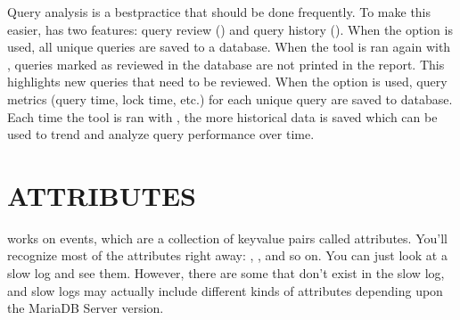\documentclass[letterpaper,10pt,english]{sphinxmanual}
\begin{document}
\sphinxAtStartPar
Query analysis is a best\sphinxhyphen{}practice that should be done frequently.  To
make this easier,  has two features: query review
({\hyperref[\detokenize{mariadb-query-digest:cmdoption-mariadb-query-digest-review}]{}}) and query history ({\hyperref[\detokenize{mariadb-query-digest:cmdoption-mariadb-query-digest-history}]{}}).  When the {\hyperref[\detokenize{mariadb-query-digest:cmdoption-mariadb-query-digest-review}]{}}
option is used, all unique queries are saved to a database.  When the
tool is ran again with {\hyperref[\detokenize{mariadb-query-digest:cmdoption-mariadb-query-digest-review}]{}}, queries marked as reviewed in
the database are not printed in the report.  This highlights new queries
that need to be reviewed.  When the {\hyperref[\detokenize{mariadb-query-digest:cmdoption-mariadb-query-digest-history}]{}} option is used,
query metrics (query time, lock time, etc.) for each unique query are
saved to database.  Each time the tool is ran with {\hyperref[\detokenize{mariadb-query-digest:cmdoption-mariadb-query-digest-history}]{}}, the
more historical data is saved which can be used to trend and analyze
query performance over time.


\section{ATTRIBUTES}
\label{\detokenize{mariadb-query-digest:attributes}}
\sphinxAtStartPar
{} works on events, which are a collection of key\sphinxhyphen{}value pairs
called attributes.  You’ll recognize most of the attributes right away:
, , and so on.  You can just look at a slow log
and see them.  However, there are some that don’t exist in the slow log,
and slow logs may actually include different kinds of attributes depending
upon the MariaDB Server version.
\end{document}
